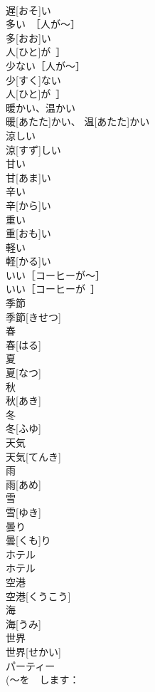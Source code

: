 \documentclass[8pt]{extreport}
\begin{document}
\begin{CJK}{UTF8}{min}
\\	遅[おそ]い	
\\	多い　［人が～］	
\\	多[おお]い　
\\	人[ひと]が~］	
\\	少ない［人が～］	
\\	少[すく]ない
\\	人[ひと]が~］	
\\	暖かい、温かい	
\\	暖[あたた]かい、 温[あたた]かい	
\\	涼しい	
\\	涼[すず]しい	
\\	甘い	
\\	甘[あま]い	
\\	辛い	
\\	辛[から]い	
\\	重い	
\\	重[おも]い	
\\	軽い	
\\	軽[かる]い	
\\	いい［コーヒーが～］	
\\	いい［コーヒーが~］	
\\	季節	
\\	季節[きせつ]	
\\	春	
\\	春[はる]	
\\	夏	
\\	夏[なつ]	
\\	秋	
\\	秋[あき]	
\\	冬	
\\	冬[ふゆ]	
\\	天気	
\\	天気[てんき]	
\\	雨	
\\	雨[あめ]	
\\	雪	
\\	雪[ゆき]	
\\	曇り	
\\	曇[くも]り	
\\	ホテル	
\\	ホテル	
\\	空港	
\\	空港[くうこう]	
\\	海	
\\	海[うみ]	
\\	世界	
\\	世界[せかい]	
\\	パーティー	
\\	(～を　します：

\end{CJK}
\end{document}
